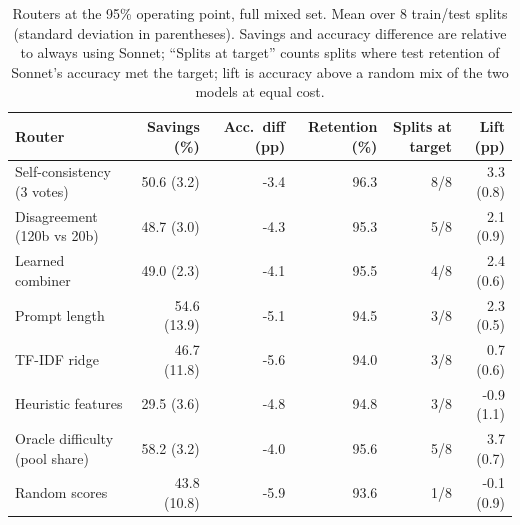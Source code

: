 \begin{table}[!htbp]
\centering\small
\caption{Routers at the 95\% operating point, full mixed set. Mean over 8 train/test splits (standard deviation in parentheses). Savings and accuracy difference are relative to always using Sonnet; ``Splits at target'' counts splits where test retention of Sonnet's accuracy met the target; lift is accuracy above a random mix of the two models at equal cost.}\label{tab:95_full}
\begin{tabular}{lrrrrr}
\toprule
Router & Savings (\%) & Acc.\ diff (pp) & Retention (\%) & Splits at target & Lift (pp) \\
\midrule
Self-consistency (3 votes) & 50.6 (3.2) & -3.4 & 96.3 & 8/8 & 3.3 (0.8) \\
Disagreement (120b vs 20b) & 48.7 (3.0) & -4.3 & 95.3 & 5/8 & 2.1 (0.9) \\
Learned combiner & 49.0 (2.3) & -4.1 & 95.5 & 4/8 & 2.4 (0.6) \\
Prompt length & 54.6 (13.9) & -5.1 & 94.5 & 3/8 & 2.3 (0.5) \\
TF-IDF ridge & 46.7 (11.8) & -5.6 & 94.0 & 3/8 & 0.7 (0.6) \\
Heuristic features & 29.5 (3.6) & -4.8 & 94.8 & 3/8 & -0.9 (1.1) \\
Oracle difficulty (pool share) & 58.2 (3.2) & -4.0 & 95.6 & 5/8 & 3.7 (0.7) \\
Random scores & 43.8 (10.8) & -5.9 & 93.6 & 1/8 & -0.1 (0.9) \\
\bottomrule
\end{tabular}
\end{table}
